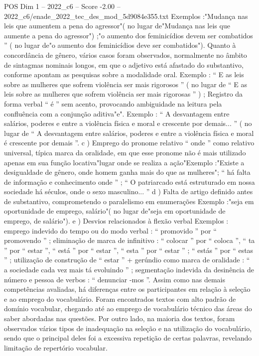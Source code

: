 \begin{textsample}{POS Dim 1 – 2022\_c6 – Score -2.00 – 2022\_c6/enade\_2022\_tec\_des\_mod\_5d9084e355.txt}
Exemplos :"Mudança nas leis que aumentem a pena do agressor"( no lugar de"Mudança nas leis que aumente a pena do agressor") ;"o aumento dos feminicídios devem ser combatidos ” ( no lugar de"o aumento dos feminicídios deve ser combatidos").
Quanto à concordância de gênero, vários casos foram observados, normalmente no âmbito de sintagmas nominais longos, em que o adjetivo está afastado do substantivo, conforme apontam as pesquisas sobre a modalidade oral.
Exemplo : “ E as leis sobre as mulheres que sofrem violência ser mais rigorosos ” ( no lugar de “ E as leis sobre as mulheres que sofrem violência ser mais rigorosas ” ) ; Registro da forma verbal “ é ” sem acento, provocando ambiguidade na leitura pela confluência com a conjunção aditiva"e".
Exemplo : “ A desvantagem entre salários, poderes e entre a violência física e moral e crescente por demais... ” ( no lugar de “ A desvantagem entre salários, poderes e entre a violência física e moral é crescente por demais ”. c ) Emprego do pronome relativo “ onde ” como relativo universal, típica marca da oralidade, em que esse pronome não é mais utilizado apenas em sua função locativa"lugar onde se realiza a ação"Exemplo :"Existe a desigualdade de gênero, onde homem ganha mais do que as mulheres"; “ há falta de informação e conhecimento onde ” ; “ O patriarcado está estruturado em nossa sociedade há séculos, onde o sexo masculino... ” d ) Falta de artigo definido antes de substantivo, comprometendo o paralelismo em enumerações Exemplo :"seja em oportunidade de emprego, salário"( no lugar de"seja em oportunidade de emprego, de salário"). e ) Desvios relacionados à flexão verbal Exemplos : emprego indevido do tempo ou do modo verbal : “ promovido ” por “ promovendo ” ; eliminação de marca de infinitivo : “ colocar ” por “ coloca ”, “ ta ” por “ estar ”, “ está ” por “ estar ”, “ esta ” por “ estar ” ; “ estás ” por “ estas ” ; utilização de construção de “ estar ” + gerúndio como marca de oralidade : “ a sociedade cada vez mais tá evoluindo ” ; segmentação indevida da desinência de número e pessoa de verbos : “ denunciar -mos ”.
Assim como nas demais competências avaliadas, há diferenças entre os participantes em relação à seleção e ao emprego do vocabulário.
Foram encontrados textos com alto padrão de domínio vocabular, chegando até ao emprego de vocabulário técnico das áreas do saber abordadas nas questões.
Por outro lado, na maioria dos textos, foram observados vários tipos de inadequação na seleção e na utilização do vocabulário, sendo que o principal deles foi a excessiva repetição de certas palavras, revelando limitação de repertório vocabular.

\end{textsample}
